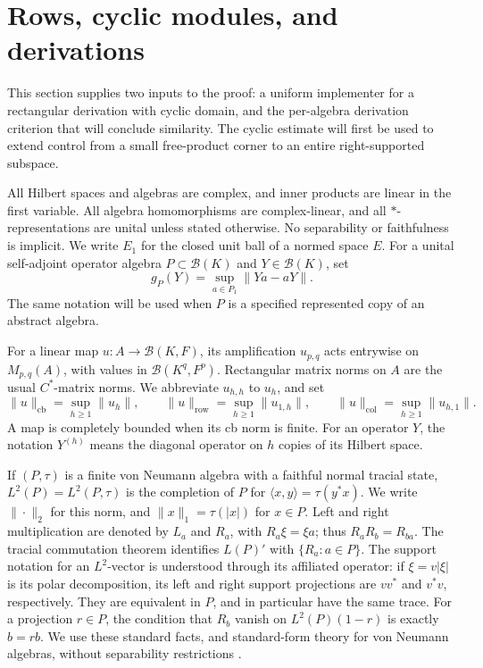 \section{Rows, cyclic modules, and derivations}
\label{sec:preliminaries}

This section supplies two inputs to the proof: a uniform implementer
for a rectangular derivation with cyclic domain, and the per-algebra
derivation criterion that will conclude similarity. The cyclic estimate
will first be used to extend control from a small free-product corner
to an entire right-supported subspace.

All Hilbert spaces and algebras are complex, and inner products are linear
in the first variable. All algebra homomorphisms are complex-linear, and
all \(*\)-representations are unital unless stated otherwise. No
separability or faithfulness is implicit. We write \(E_1\) for the closed
unit ball of a normed space \(E\). For a unital self-adjoint operator
algebra \(P\subset\mathcal B(K)\) and \(Y\in\mathcal B(K)\), set
\begin{equation}
 g_P(Y)=\sup_{a\in P_1}\|Ya-aY\|.
 \label{eq:commutator-seminorm}
\end{equation}
The same notation will be used when \(P\) is a specified represented
copy of an abstract algebra.

For a linear map \(u:A\to\mathcal B(K,F)\), its amplification
\(u_{p,q}\) acts entrywise on \(M_{p,q}(A)\), with values in
\(\mathcal B(K^q,F^p)\). Rectangular matrix norms on \(A\) are the usual
\(C^*\)-matrix norms. We abbreviate \(u_{h,h}\) to \(u_h\), and set
\[
 \|u\|_{\mathrm{cb}}=\sup_{h\ge1}\|u_h\|,\qquad
 \|u\|_{\mathrm{row}}=\sup_{h\ge1}\|u_{1,h}\|,\qquad
 \|u\|_{\mathrm{col}}=\sup_{h\ge1}\|u_{h,1}\|.
\]
A map is completely bounded when its cb norm is finite. For an operator
\(Y\), the notation \(Y^{(h)}\) means the diagonal operator on \(h\)
copies of its Hilbert space.

If \((P,\tau)\) is a finite von Neumann algebra with a faithful normal
tracial state, \(L^2(P)=L^2(P,\tau)\) is the completion of \(P\) for
\(\langle x,y\rangle=\tau(y^*x)\). We write \(\|\cdot\|_2\) for this
norm, and \(\|x\|_1=\tau(|x|)\) for \(x\in P\). Left and right
multiplication are denoted by \(L_a\) and \(R_a\), with
\(R_a\xi=\xi a\); thus \(R_aR_b=R_{ba}\). The tracial commutation
theorem identifies \(L(P)'\) with \(\{R_a:a\in P\}\). The support
notation for an \(L^2\)-vector is understood through its affiliated
operator: if \(\xi=v|\xi|\) is its polar decomposition, its left and
right support projections are \(vv^*\) and \(v^*v\), respectively.
They are equivalent in \(P\), and in particular have the same trace.
For a projection \(r\in P\), the condition that \(R_b\) vanish on
\(L^2(P)(1-r)\) is exactly \(b=rb\).
We use these standard facts, and standard-form theory for von Neumann
algebras, without separability restrictions
\citep{Takesaki1979,Haagerup1975}.

